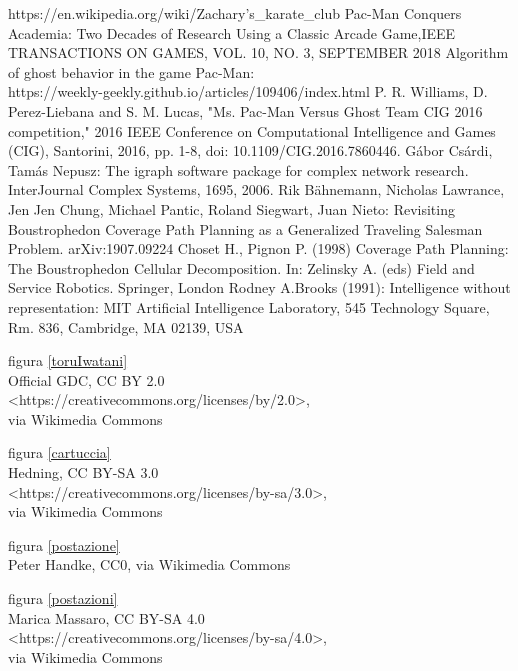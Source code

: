 \documentclass[8pt]{book}
\begin{document}
\begin{thebibliography}{9}

https://en.wikipedia.org/wiki/Zachary's\_karate\_club
  Pac-Man Conquers Academia: Two Decades of Research Using a Classic Arcade Game,IEEE TRANSACTIONS ON GAMES, VOL. 10, NO. 3, SEPTEMBER 2018
\bibitem{}
  Algorithm of ghost behavior in the game Pac-Man: \\https://weekly-geekly.github.io/articles/109406/index.html
   P. R. Williams, D. Perez-Liebana and S. M. Lucas, "Ms. Pac-Man Versus Ghost Team CIG 2016 competition," 2016 IEEE Conference on Computational Intelligence and Games (CIG), Santorini, 2016, pp. 1-8, doi: 10.1109/CIG.2016.7860446.
Gábor Csárdi, Tamás Nepusz: The igraph software package for complex network research. InterJournal Complex Systems, 1695, 2006. 
  Rik Bähnemann, Nicholas Lawrance, Jen Jen Chung, Michael Pantic, Roland Siegwart, Juan Nieto:
Revisiting Boustrophedon Coverage Path Planning as a Generalized Traveling Salesman Problem. arXiv:1907.09224
  Choset H., Pignon P. (1998) Coverage Path Planning: The Boustrophedon Cellular Decomposition. In: Zelinsky A. (eds) Field and Service Robotics. Springer, London
Rodney A.Brooks (1991): 
Intelligence without representation: MIT Artificial Intelligence Laboratory, 545 Technology Square, Rm. 836, Cambridge, MA 02139, USA

  figura \ref{toruIwatani}\\
  Official GDC, CC BY 2.0\\
  <https://creativecommons.org/licenses/by/2.0>,\\
  via Wikimedia Commons

  figura \ref{cartuccia}\\
  Hedning, CC BY-SA 3.0\\
  <https://creativecommons.org/licenses/by-sa/3.0>,\\
  via Wikimedia Commons

  figura \ref{postazione}\\
  Peter Handke, CC0, via Wikimedia Commons

  figura \ref{postazioni}\\
  Marica Massaro, CC BY-SA 4.0\\
  <https://creativecommons.org/licenses/by-sa/4.0>,\\
  via Wikimedia Commons
  
\end{thebibliography}
\end{document}
